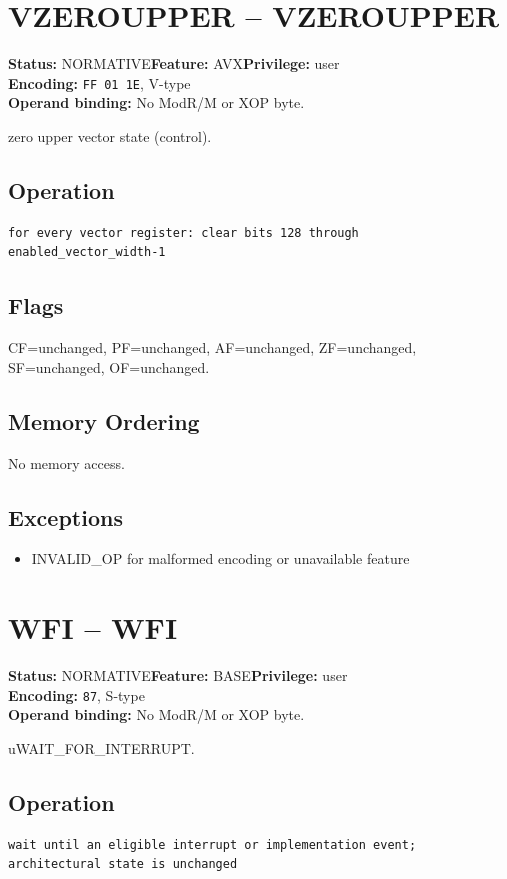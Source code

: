 \documentclass[10pt]{article}
\begin{document}
\section{VZEROUPPER -- VZEROUPPER}
\textbf{Status:} NORMATIVE\quad \textbf{Feature:} AVX\quad \textbf{Privilege:} user\\
\textbf{Encoding:} \texttt{FF 01 1E}, V-type\\
\textbf{Operand binding:} No ModR/M or XOP byte.

zero upper vector state (control).

\subsection*{Operation}
\begin{lstlisting}
for every vector register: clear bits 128 through enabled_vector_width-1
\end{lstlisting}
\subsection*{Flags}
CF=unchanged, PF=unchanged, AF=unchanged, ZF=unchanged, SF=unchanged, OF=unchanged.
\subsection*{Memory Ordering}
No memory access.
\subsection*{Exceptions}
\begin{itemize}
\item INVALID\_OP for malformed encoding or unavailable feature
\end{itemize}
\clearpage

\section{WFI -- WFI}
\textbf{Status:} NORMATIVE\quad \textbf{Feature:} BASE\quad \textbf{Privilege:} user\\
\textbf{Encoding:} \texttt{87}, S-type\\
\textbf{Operand binding:} No ModR/M or XOP byte.

uWAIT\_FOR\_INTERRUPT.

\subsection*{Operation}
\begin{lstlisting}
wait until an eligible interrupt or implementation event; architectural state is unchanged
\end{lstlisting}
\end{document}
